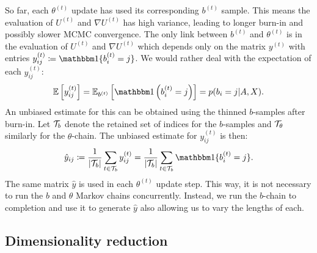 So far, each $\theta^{(t)}$ update has used its corresponding $b^{(t)}$ sample. This means the evaluation of $U^{(t)}$ and $\nabla U^{(t)}$ has high variance, leading to longer burn-in and possibly slower MCMC convergence. The only link between $b^{(t)}$ and $\theta^{(t)}$ is in the evaluation of $U^{(t)}$ and $\nabla U^{(t)}$ which depends only on the matrix $y^{(t)}$ with entries $y_{ij}^{(t)} \coloneqq \one\{b_i^{(t)} = j\}$. We would rather deal with the expectation of each $y_{ij}^{(t)}$:
%
\begin{equation}
	\Expect \left[ y_{ij}^{(t)} \right] = \Expect_{b^{(t)}} \left[ \one \left( b_{i}^{(t)} = j \right) \right]
	= p(b_i = j | A, X).
\end{equation}
%
An unbiased estimate for this can be obtained using 
the thinned $b$-samples after burn-in.
Let $\mathcal{T}_b$  denote the retained set of indices 
for the $b$-samples and $\mathcal{T}_\theta$ similarly for the $\theta$-chain. 
The unbiased estimate for $y_{ij}^{(t)}$ is then:
%
\begin{equation}
	\hat{y}_{ij} \coloneqq \frac{1}{|\Tcal_b|} \sum_{t \in \Tcal_b} y_{ij}^{(t)} = \frac{1}{|\Tcal_b|} \sum_{t \in \Tcal_b} \one\{b_i^{(t)} = j\}.
	\label{eqn:y-hat}
\end{equation}
%
The same matrix $\hat{y}$ is used in each $\theta^{(t)}$ update step.
This way, it is not necessary to run the $b$ and $\theta$ Markov chains 
concurrently. Instead, we run the $b$-chain to completion and use it 
to generate $\hat{y}$ also allowing us to vary the lengths of each.

\subsection{Dimensionality reduction}
\label{sec:dim-reduction}

